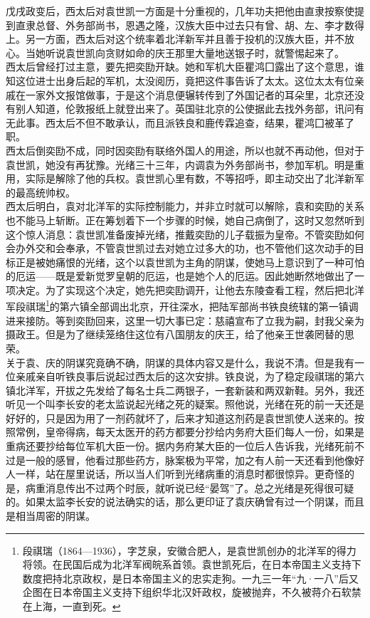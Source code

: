 戊戌政变后，西太后对袁世凯一方面是十分重视的，几年功夫把他由直隶按察使提到直隶总督、外务部尚书，恩遇之隆，汉族大臣中过去只有曾、胡、左、李才数得上。另一方面，西太后对这个统率着北洋新军并且善于投机的汉族大臣，并不放心。当她听说袁世凯向贪财如命的庆王那里大量地送银子时，就警惕起来了。\\

西太后曾经打过主意，要先把奕劻开缺。她和军机大臣瞿鸿囗露出了这个意思，谁知这位进士出身后起的军机，太没阅历，竟把这件事告诉了太太。这位太太有位亲戚在一家外文报馆做事，于是这个消息便辗转传到了外国记者的耳朵里，北京还没有别人知道，伦敦报纸上就登出来了。英国驻北京的公使据此去找外务部，讯问有无此事。西太后不但不敢承认，而且派铁良和鹿传霖追查，结果，瞿鸿囗被革了职。\\

西太后倒奕劻不成，同时因奕劻有联络外国人的用途，所以也就不再动他，但对于袁世凯，她没有再犹豫。光绪三十三年，内调袁为外务部尚书，参加军机。明是重用，实际是解除了他的兵权。袁世凯心里有数，不等招呼，即主动交出了北洋新军的最高统帅权。\\

西太后明白，袁对北洋军的实际控制能力，并非立时就可以解除，袁和奕劻的关系也不能马上斩断。正在筹划着下一个步骤的时候，她自己病倒了，这时又忽然听到这个惊人消息：袁世凯准备废掉光绪，推戴奕劻的儿子载振为皇帝。不管奕劻如何会办外交和会奉承，不管袁世凯过去对她立过多大的功，也不管他们这次动手的目标正是被她痛恨的光绪，这个以袁世凯为主角的阴谋，使她马上意识到了一种可怕的厄运——既是爱新觉罗皇朝的厄运，也是她个人的厄运。因此她断然地做出了一项决定。为了实现这个决定，她先把奕劻调开，让他去东陵查看工程，然后把北洋军段祺瑞\footnote{段祺瑞（1864—1936），字芝泉，安徽合肥人，是袁世凯创办的北洋军的得力将领。在民国后成为北洋军阀皖系首领。袁世凯死后，在日本帝国主义支持下数度把持北京政权，是日本帝国主义的忠实走狗。一九三一年“九·一八”后又企图在日本帝国主义支持下组织华北汉奸政权，旋被抛弃，不久被蒋介石软禁在上海，一直到死。}的第六镇全部调出北京，开往深水，把陆军部尚书铁良统辖的第一镇调进来接防。等到奕劻回来，这里一切大事已定：慈禧宣布了立我为嗣，封我父亲为摄政王。但是为了继续笼络住这位有八国朋友的庆王，给了他亲王世袭罔替的思荣。\\

关于袁、庆的阴谋究竟确不确，阴谋的具体内容又是什么，我说不清。但是我有一位亲戚亲自听铁良事后说起过西太后的这次安排。铁良说，为了稳定段祺瑞的第六镇北洋军，开拔之先发给了每名士兵二两银子，一套新装和两双新鞋。另外，我还听见一个叫李长安的老太监说起光绪之死的疑案。照他说，光绪在死的前一天还是好好的，只是因为用了一剂药就坏了，后来才知道这剂药是袁世凯使人送来的。按照常例，皇帝得病，每天太医开的药方都要分抄给内务府大臣们每人一份，如果是重病还要抄给每位军机大臣一份。据内务府某大臣的一位后人告诉我，光绪死前不过是一般的感冒，他看过那些药方，脉案极为平常，加之有人前一天还看到他像好人一样，站在屋里说话，所以当人们听到光绪病重的消息时都很惊异。更奇怪的是，病重消息传出不过两个时辰，就听说已经“晏驾”了。总之光绪是死得很可疑的。如果太监李长安的说法确实的话，那么更印证了袁庆确曾有过一个阴谋，而且是相当周密的阴谋。\\

